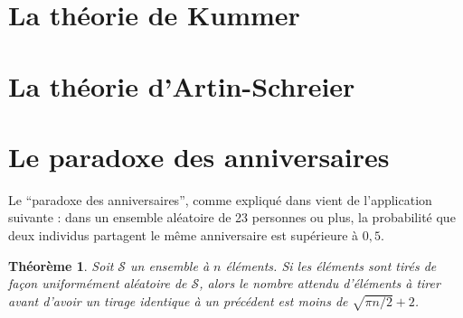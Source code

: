 \documentclass[a4paper, titlepage]{article}
\newtheorem{theo}{Théorème}[section]
\theoremstyle{definition}
\theoremstyle{remark}
\begin{document}
\section{La théorie de Kummer}

\section{La théorie d'Artin-Schreier}

\section{Le paradoxe des anniversaires}

Le ``paradoxe des anniversaires'', comme expliqué dans \cite[sous-section 14.1]{galbraith2012} vient de l'application suivante : dans un ensemble aléatoire de 23 personnes ou plus, la probabilité que deux individus partagent le même anniversaire est supérieure à $0,5$.

\begin{theo}\label{paradoxeAnniversaire}
Soit $\mathcal S$ un ensemble à $n$ éléments. Si les éléments sont tirés de façon uniformément aléatoire de $\mathcal S$, alors le nombre attendu d'éléments à tirer avant d'avoir un tirage identique à un précédent est moins de $\sqrt{\pi n /2} + 2$.
\end{theo}
\end{document}
